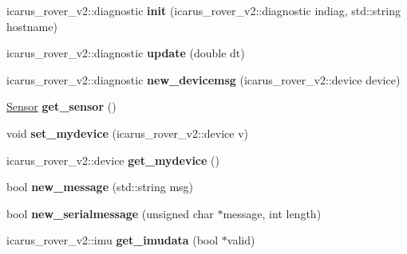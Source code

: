\begin{DoxyCompactItemize}
\item 
\mbox{\label{classIMUNodeProcess_a33c06ae49870b23b56ca9581fa84f2eb}} 
icarus\+\_\+rover\+\_\+v2\+::diagnostic {\bfseries init} (icarus\+\_\+rover\+\_\+v2\+::diagnostic indiag, std\+::string hostname)
\item 
\mbox{\label{classIMUNodeProcess_a354a496defe885237700f04b129de4c0}} 
icarus\+\_\+rover\+\_\+v2\+::diagnostic {\bfseries update} (double dt)
\item 
\mbox{\label{classIMUNodeProcess_a81931bb050ba1235dd7da19daec353db}} 
icarus\+\_\+rover\+\_\+v2\+::diagnostic {\bfseries new\+\_\+devicemsg} (icarus\+\_\+rover\+\_\+v2\+::device device)
\item 
\mbox{\label{classIMUNodeProcess_af79de268d06c18f1e363afaee2194b3e}} 
\hyperlink{structIMUNodeProcess_1_1Sensor}{Sensor} {\bfseries get\+\_\+sensor} ()
\item 
\mbox{\label{classIMUNodeProcess_a8061162605df7cf0474c8f059ba87bf7}} 
void {\bfseries set\+\_\+mydevice} (icarus\+\_\+rover\+\_\+v2\+::device v)
\item 
\mbox{\label{classIMUNodeProcess_a3099faecfe37fd7102ab4377dd591f3d}} 
icarus\+\_\+rover\+\_\+v2\+::device {\bfseries get\+\_\+mydevice} ()
\item 
\mbox{\label{classIMUNodeProcess_a3739bb95d3828dbec17c7c89e61d7b5c}} 
bool {\bfseries new\+\_\+message} (std\+::string msg)
\item 
\mbox{\label{classIMUNodeProcess_a9fe4a73b338077214197615222f52c00}} 
bool {\bfseries new\+\_\+serialmessage} (unsigned char $\ast$message, int length)
\item 
\mbox{\label{classIMUNodeProcess_abca8e3baef53a75279af00bc0a82a3f1}} 
icarus\+\_\+rover\+\_\+v2\+::imu {\bfseries get\+\_\+imudata} (bool $\ast$valid)
\item 
\mbox{\label{classIMUNodeProcess_a0513c9f95731a5d0003d9a36eed8b5ad}} 

\end{DoxyCompactItemize}
